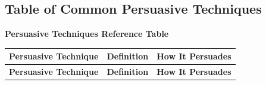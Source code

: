 \documentclass[a4paper]{article}
\begin{document}
\newpage
\subsection{Table of Common Persuasive Techniques}

\begin{center}
\textbf{\LARGE Persuasive Techniques Reference Table}
\end{center}

\begin{longtable}{|p{2cm}|p{3.25cm}|p{3.25cm}|}
\hline
\textbf{Persuasive Technique} & \textbf{Definition} & \textbf{How It Persuades} \\
\hline
\endfirsthead

\hline
\textbf{Persuasive Technique} & \textbf{Definition} & \textbf{How It Persuades} \\
\hline
\endhead


\end{longtable}
\end{document}
